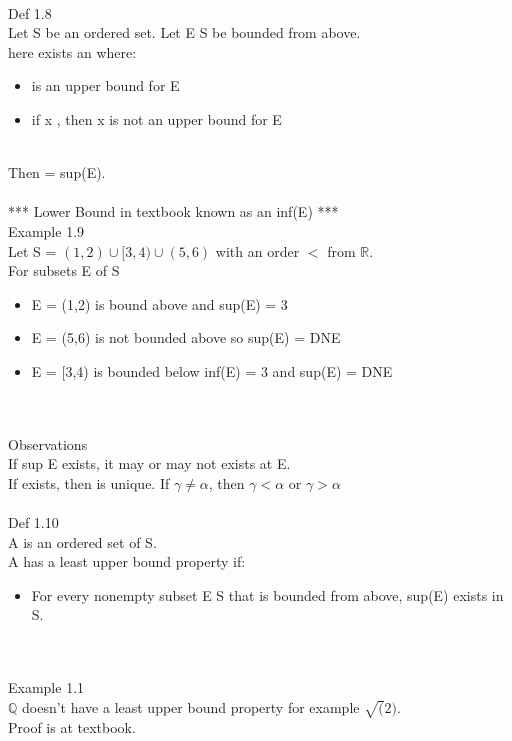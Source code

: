\hfill \\
Def 1.8 \\
Let S be an ordered set. Let E \subset S be bounded from above. \\
here exists an \alpha where:
\begin{itemize}
	\item \alpha is an upper bound for E
	\item if x \< \alpha, then x is not an upper bound for E
\end{itemize} \\
Then \alpha = sup(E). \\

\hfill \\
*** Lower Bound in textbook known as an inf(E) *** \\
Example 1.9 \\
Let S = $ (1,2) \cup [3,4) \cup (5,6) $ with an order $ < $ from $ \mathbb{R} $. \\
For subsets E of S \\
\begin{itemize}
	\item E = (1,2) is bound above and sup(E) = 3
	\item E = (5,6) is not bounded above so sup(E) = DNE
	\item E = [3,4) is bounded below inf(E) = 3 and sup(E) = DNE
\end{itemize} \\

\hfill \\
Observations \\
If sup E exists, it may or may not exists at E. \\
If \alpha exists, then \alpha is unique.
If $ \gamma \neq \alpha $, then $ \gamma < \alpha $ or $ \gamma > \alpha $ \\

\hfill \\
Def 1.10 \\
A is an ordered set of S. \\
A has a least upper bound property if:
\begin{itemize}
	\item For every nonempty subset E \subset S that is bounded from above, sup(E) exists in S.
\end{itemize} \\

\hill \\
Example 1.1 \\
$ \mathbb{Q} $ doesn't have a least upper bound property for example $ \sqrt(2) $. \\
Proof is at textbook.














